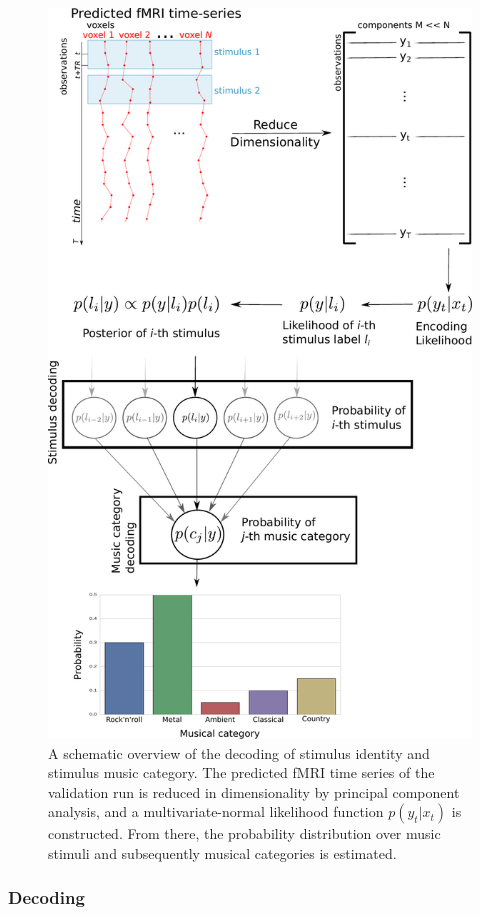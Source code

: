 \begin{figure}[!htb]
  \centering
  \includegraphics[width=.8\linewidth]{pics/decoding_scheme.pdf}

  \caption{A schematic overview of the decoding of stimulus identity and stimulus music category. The
    predicted f{MRI} time series of the validation run is reduced in
    dimensionality by principal component analysis, and a multivariate-normal
    likelihood function $p(y_{t}|x_{t})$ is constructed.  From there, the
  probability distribution over music stimuli and subsequently musical
categories is estimated.}

 \label{fig:decoding_scheme}
\end{figure}


\subsubsection*{Decoding}

